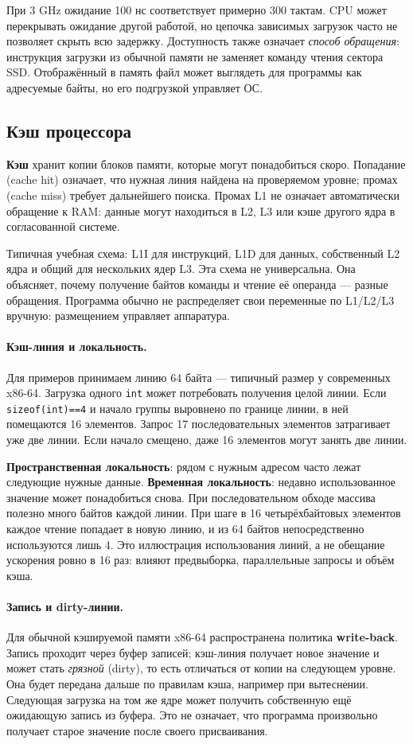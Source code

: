 При 3 GHz ожидание 100 нс соответствует примерно 300 тактам.
CPU может перекрывать ожидание другой работой, но цепочка зависимых загрузок
часто не позволяет скрыть всю задержку. Доступность также означает
\emph{способ обращения}: инструкция загрузки из обычной памяти не заменяет
команду чтения сектора SSD. Отображённый в память файл может выглядеть для
программы как адресуемые байты, но его подгрузкой управляет ОС.

\subsection{Кэш процессора}
\textbf{Кэш} хранит копии блоков памяти, которые могут понадобиться скоро.
Попадание (cache hit) означает, что нужная линия найдена на проверяемом
уровне; промах (cache miss) требует дальнейшего поиска. Промах L1 не означает
автоматически обращение к RAM: данные могут находиться в L2, L3 или кэше
другого ядра в согласованной системе.

Типичная учебная схема: L1I для инструкций, L1D для данных, собственный L2
ядра и общий для нескольких ядер L3. Эта схема не универсальна. Она
объясняет, почему получение байтов команды и чтение её операнда --- разные
обращения. Программа обычно не распределяет свои переменные по L1/L2/L3
вручную: размещением управляет аппаратура.

\paragraph{Кэш-линия и локальность.}
Для примеров принимаем линию 64 байта --- типичный размер у современных
x86-64. Загрузка одного \texttt{int} может потребовать получения целой линии.
Если \texttt{sizeof(int)==4} и начало группы выровнено по границе линии,
в ней помещаются 16 элементов. Запрос 17 последовательных элементов
затрагивает уже две линии. Если начало смещено, даже 16 элементов могут
занять две линии.

\textbf{Пространственная локальность}: рядом с нужным адресом часто лежат
следующие нужные данные. \textbf{Временная локальность}: недавно использованное
значение может понадобиться снова. При последовательном обходе массива
полезно много байтов каждой линии. При шаге в 16 четырёхбайтовых элементов
каждое чтение попадает в новую линию, и из 64 байтов непосредственно
используются лишь 4. Это иллюстрация использования линий, а не обещание
ускорения ровно в 16 раз: влияют предвыборка, параллельные запросы и объём кэша.

\paragraph{Запись и dirty-линии.}
Для обычной кэшируемой памяти x86-64 распространена политика
\textbf{write-back}. Запись проходит через буфер записей; кэш-линия получает
новое значение и может стать \emph{грязной} (dirty), то есть отличаться от
копии на следующем уровне. Она будет передана дальше по правилам кэша,
например при вытеснении. Следующая загрузка на том же ядре может получить
собственную ещё ожидающую запись из буфера. Это не означает, что программа
произвольно получает старое значение после своего присваивания.

